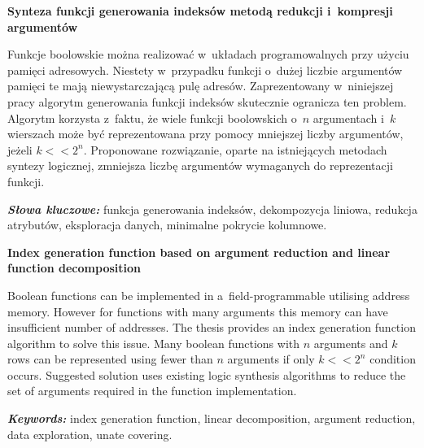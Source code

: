 \newpage
\vspace{10cm}

\newpage
\begin{center}
	\textbf{Synteza funkcji generowania indeksów metodą redukcji i~kompresji argumentów}
\end{center}

Funkcje boolowskie można realizować w~układach programowalnych przy użyciu pamięci adresowych.
Niestety w~przypadku funkcji o~dużej liczbie argumentów pamięci te mają niewystarczającą pulę adresów.
Zaprezentowany w~niniejszej pracy algorytm generowania funkcji indeksów skutecznie ogranicza ten problem.
Algorytm korzysta z~faktu,
że wiele funkcji boolowskich o~$n$ argumentach i~$k$ wierszach może być reprezentowana przy pomocy mniejszej liczby argumentów,
jeżeli $k<<2^n$.
Proponowane rozwiązanie,
oparte na istniejących metodach syntezy logicznej,
zmniejsza liczbę argumentów wymaganych do reprezentacji funkcji.

\textit{\textbf{Słowa kluczowe:}} funkcja generowania indeksów, dekompozycja liniowa, redukcja atrybutów, eksploracja danych, minimalne pokrycie kolumnowe.

	\vspace{1cm}
\newpage

\begin{center}
    \textbf{Index generation function based on argument reduction and linear function decomposition}
\end{center}

Boolean functions can be implemented in a~field-programmable utilising address memory.
However for functions with many arguments this memory can have insufficient number of addresses.
The thesis provides an index generation function algorithm to solve this issue.
Many boolean functions with $n$ arguments and $k$ rows can be represented using fewer than $n$ arguments if only $k<<2^n$ condition occurs.
Suggested solution uses existing logic synthesis algorithms to reduce the set of arguments required in the function implementation.

\textit{\textbf{Keywords:}} index generation function, linear decomposition, argument reduction, data exploration, unate covering.

